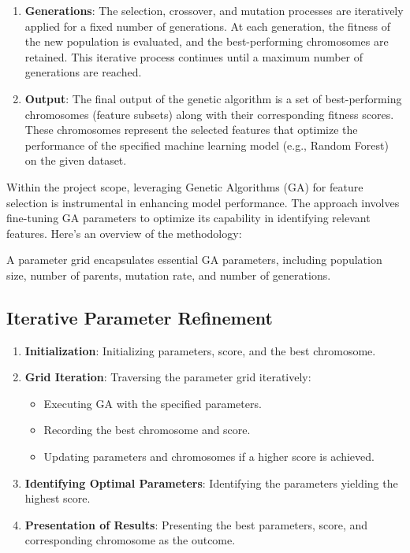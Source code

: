 \begin{enumerate}
    \item \textbf{Generations}: The selection, crossover, and mutation processes are iteratively applied for a fixed number of generations. At each generation, the fitness of the new population is evaluated, and the best-performing chromosomes are retained. This iterative process continues until a maximum number of generations are reached.
    
    \item \textbf{Output}: The final output of the genetic algorithm is a set of best-performing chromosomes (feature subsets) along with their corresponding fitness scores. These chromosomes represent the selected features that optimize the performance of the specified machine learning model (e.g., Random Forest) on the given dataset.
\end{enumerate}


Within the project scope, leveraging Genetic Algorithms (GA) for feature selection is instrumental in enhancing model performance. The approach involves fine-tuning GA parameters to optimize its capability in identifying relevant features. Here's an overview of the methodology:

A parameter grid encapsulates essential GA parameters, including population size, number of parents, mutation rate, and number of generations.

\pagebreak
\subsection{Iterative Parameter Refinement}

\begin{enumerate}
    \item \textbf{Initialization}: Initializing parameters, score, and the best chromosome.
    \item \textbf{Grid Iteration}: Traversing the parameter grid iteratively:
        \begin{itemize}
            \item Executing GA with the specified parameters.
            \item Recording the best chromosome and score.
            \item Updating parameters and chromosomes if a higher score is achieved.
        \end{itemize}
    \item \textbf{Identifying Optimal Parameters}: Identifying the parameters yielding the highest score.
    \item \textbf{Presentation of Results}: Presenting the best parameters, score, and corresponding chromosome as the outcome.
\end{enumerate}

